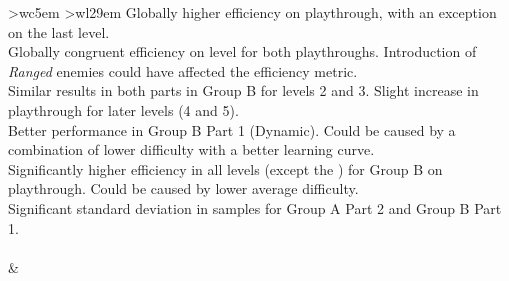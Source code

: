 \begin{table}[hbt!]
\begin{center}
\begin{tabular}{ >{\footnotesize}w{c}{5em} >{\footnotesize}w{l}{29em} }
{            %
            \textbullet\space Globally higher efficiency on  playthrough, with an exception on the last level. \\
            \textbullet\space Globally congruent efficiency on  level for both playthroughs. Introduction of \emph{Ranged} enemies could have affected the efficiency metric. \\
            \textbullet\space Similar results in both parts in Group B for levels 2 and 3. Slight increase in  playthrough for later levels (4 and 5). \\
            \textbullet\space Better performance in Group B Part 1 (Dynamic). Could be caused by a combination of lower difficulty with a better learning curve. \\
            \textbullet\space Significantly higher efficiency in all levels (except the ) for Group B on  playthrough. Could be caused by lower average difficulty. \\
            \textbullet\space Significant standard deviation in samples for Group A Part 2 and Group B Part 1. \\
        } \\
         & 
        \makecell*[{{p{35em}}}]
        {
}
\end{tabular}
\end{center}
\end{table}
